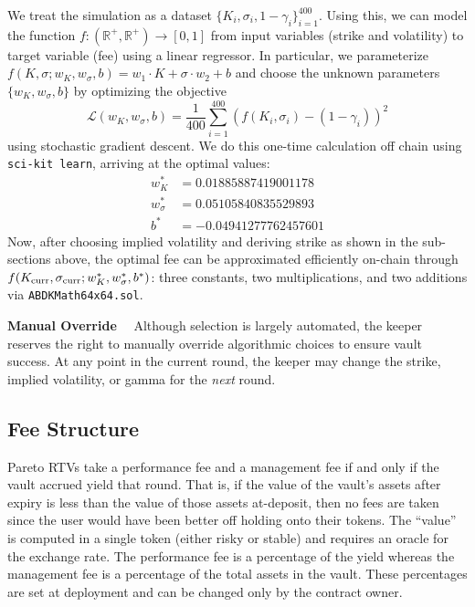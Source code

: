 \documentclass[hidelinks, 12pt]{article}
\begin{document}
We treat the simulation as a dataset $\{K_i, \sigma_i, 1 - \gamma_i\}_{i=1}^{400}$. Using this, we can model the function $f: (\mathbb{R}^+, \mathbb{R}^+) \rightarrow [0,1]$ from input variables (strike and volatility) to target variable (fee) using a linear regressor. In particular, we parameterize $f(K, \sigma; w_K, w_\sigma, b) = w_1 \cdot K + \sigma \cdot w_2 + b$ and choose the unknown parameters $\{w_K, w_\sigma, b\}$ by optimizing the objective
\begin{equation}
\mathcal{L}(w_K, w_\sigma, b) = \frac{1}{400}\sum_{i=1}^{400} \left(f(K_i, \sigma_i) - (1 - \gamma_i) \right)^2
\label{eq:loss}
\end{equation}
using stochastic gradient descent. We do this one-time calculation off chain using \texttt{sci-kit learn}, arriving at the optimal values:
\begin{align*}
w^*_K &= 0.01885887419001178 \\
w^*_\sigma &= 0.05105840835529893 \\
b^* &= -0.04941277762457601
\end{align*}
Now, after choosing implied volatility and deriving strike as shown in the sub-sections above, the optimal fee can be approximated efficiently on-chain through $f(K_{\textup{curr}}, \sigma_{\textup{curr}}; w^*_K, w^*_\sigma, b^*)$: three constants, two multiplications, and two additions via \texttt{ABDKMath64x64.sol}.

\textbf{Manual Override}$\quad$ Although selection is largely automated, the keeper reserves the right to manually override algorithmic choices to ensure vault success. At any point in the current round, the keeper may change the strike, implied volatility, or gamma for the \textit{next} round.


\subsection{Fee Structure}
\label{sec:fees}

Pareto RTVs take a performance fee and a management fee if and only if the vault accrued yield that round.
That is, if the value of the vault's assets after expiry is less than the value of those assets at-deposit, then no fees are taken since the user would have been better off holding onto their tokens.
The ``value'' is computed in a single token (either risky or stable) and requires an oracle for the exchange rate.
The performance fee is a percentage of the yield whereas the management fee is a percentage of the total assets in the vault. These percentages are set at deployment and can be changed only by the contract owner.
\end{document}
